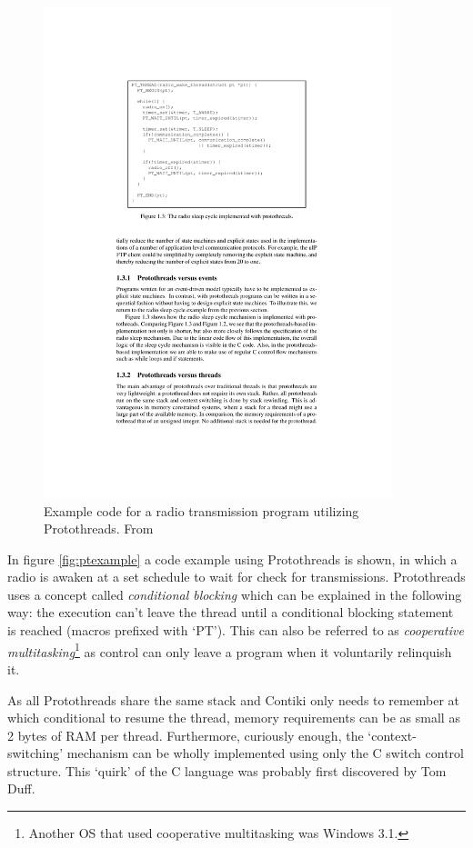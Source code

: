 \documentclass[final,a4paper,twoside,11pt,onecolumn]{report}
\begin{document}
\begin{figure}[h!]
   \centering
   \includegraphics[width=0.9\textwidth]{dunkels-protothreads-example}
   \caption{Example code for a radio transmission program utilizing Protothreads. From \citep[p.7]{dunkels2005protothreads}}
   \label{fig:ptexample}
\end{figure}

In figure \vref{fig:ptexample} a code example using Protothreads is shown, in which a radio is awaken at a set schedule to wait for check for transmissions. Protothreads uses a concept called \emph{conditional blocking} which can be explained in the following way: the execution can't leave the thread until a conditional blocking statement is reached (macros prefixed with `PT'). This can also be referred to as \emph{cooperative multitasking}\footnote{Another OS that used cooperative multitasking was Windows 3.1.} as control can only leave a program when it voluntarily relinquish it.

As all Protothreads share the same stack and Contiki only needs to remember at which conditional to resume the thread, memory requirements can be as small as 2 bytes of RAM per thread. Furthermore, curiously enough, the `context-switching' mechanism can be wholly implemented using only the C switch control structure. This `quirk' of the C language was probably first discovered by Tom Duff\citep[p.10]{dunkels2005protothreads}\cite{wiki:duffs}.
\end{document}
